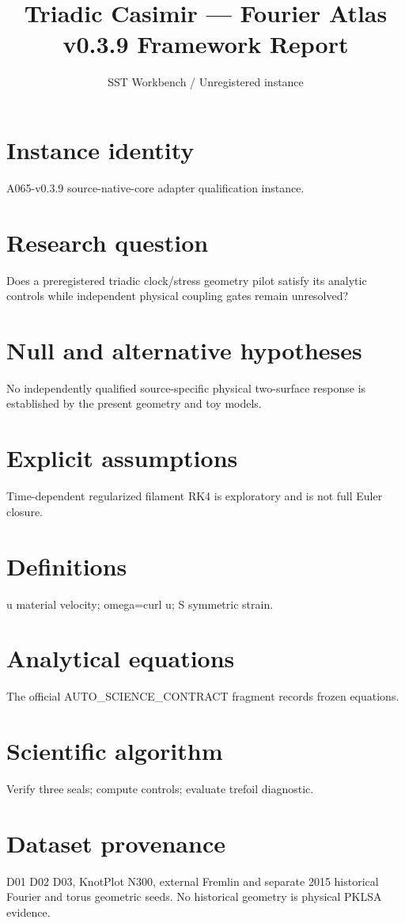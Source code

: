 \documentclass[10pt,a4paper]{article}
\title{Triadic Casimir --- Fourier Atlas v0.3.9 Framework Report}
\author{SST Workbench / Unregistered instance}
\begin{document}
\maketitle
\section{Instance identity}
A065-v0.3.9 source-native-core adapter qualification instance.
\section{Research question}
Does a preregistered triadic clock/stress geometry pilot satisfy its analytic controls while independent physical coupling gates remain unresolved?
\section{Null and alternative hypotheses}
No independently qualified source-specific physical two-surface response is established by the present geometry and toy models.
\section{Explicit assumptions}
Time-dependent regularized filament RK4 is exploratory and is not full Euler closure.
\section{Definitions}
u material velocity; omega=curl u; S symmetric strain.
\section{Analytical equations}
The official AUTO\_SCIENCE\_CONTRACT fragment records frozen equations.

\section{Scientific algorithm}
Verify three seals; compute controls; evaluate trefoil diagnostic.
\section{Dataset provenance}
D01 D02 D03, KnotPlot N300, external Fremlin and separate 2015 historical Fourier and torus geometric seeds. No historical geometry is physical PKLSA evidence.
\end{document}
